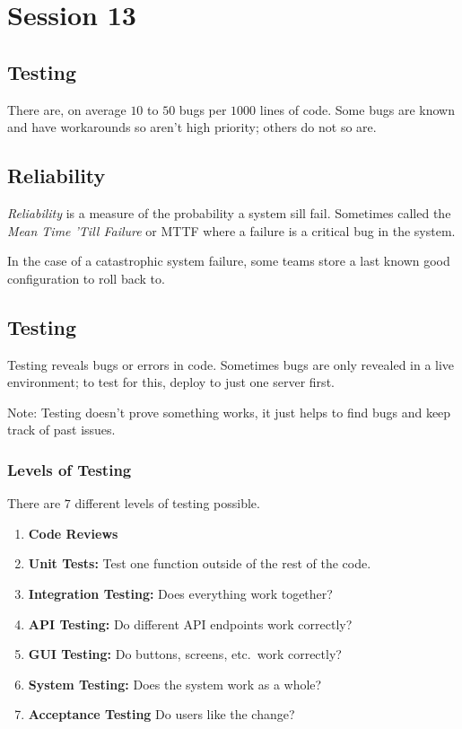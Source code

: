 \section{Session 13}\label{sec:session_13_one}

\subsection{Testing}\label{sub:testing}

There are, on average \(10\) to \(50\) bugs per \(1000\) lines of code.
Some bugs are known and have workarounds so aren't high priority; others do not so are.

\subsection{Reliability}\label{ssub:reliability}

\emph{Reliability} is a measure of the probability a system sill fail.
Sometimes called the \emph{Mean Time 'Till Failure} or MTTF where a failure is a critical bug in the system.

In the case of a catastrophic system failure, some teams store a last known good configuration to roll back to.

\subsection{Testing}\label{ssub:testing}

Testing reveals bugs or errors in code.
Sometimes bugs are only revealed in a live environment; to test for this, deploy to just one server first.

\begin{note}
	Note: Testing doesn't prove something works, it just helps to find bugs and keep track of past issues.
\end{note}

\subsubsection{Levels of Testing}\label{ssub:levels_of_testing}

There are \(7\) different levels of testing possible.

\begin{enumerate}
	\item \textbf{Code Reviews}
	\item \textbf{Unit Tests:} Test one function outside of the rest of the code.
	\item \textbf{Integration Testing:} Does everything work together?
	\item \textbf{API Testing:} Do different API endpoints work correctly?
	\item \textbf{GUI Testing:} Do buttons, screens, etc.\ work correctly?
	\item \textbf{System Testing:} Does the system work as a whole?
	\item \textbf{Acceptance Testing} Do users like the change?
\end{enumerate}

